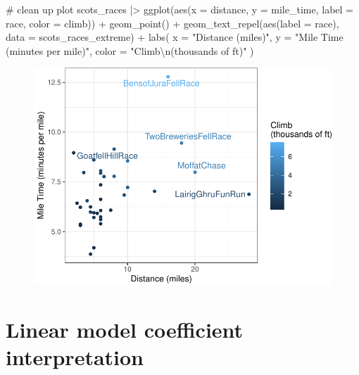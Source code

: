\documentclass[
  11pt,
  letterpaper,
  oneside]{book}
\newenvironment{Shaded}{\begin{snugshade}}{\end{snugshade}}
\newcommand{\AttributeTok}[1]{\textcolor[rgb]{0.40,0.45,0.13}{#1}}
\newcommand{\CommentTok}[1]{\textcolor[rgb]{0.37,0.37,0.37}{#1}}
\newcommand{\FunctionTok}[1]{\textcolor[rgb]{0.28,0.35,0.67}{#1}}
\newcommand{\NormalTok}[1]{\textcolor[rgb]{0.00,0.23,0.31}{#1}}
\newcommand{\SpecialCharTok}[1]{\textcolor[rgb]{0.37,0.37,0.37}{#1}}
\newcommand{\StringTok}[1]{\textcolor[rgb]{0.13,0.47,0.30}{#1}}
\theoremstyle{plain}
\theoremstyle{plain}
\theoremstyle{definition}
\theoremstyle{definition}
\theoremstyle{plain}
\theoremstyle{remark}
\begin{document}
\begin{Shaded}
\begin{Highlighting}[]
\CommentTok{\# clean up plot}
\NormalTok{scots\_races }\SpecialCharTok{|\textgreater{}}
  \FunctionTok{ggplot}\NormalTok{(}\FunctionTok{aes}\NormalTok{(}\AttributeTok{x =}\NormalTok{ distance, }\AttributeTok{y =}\NormalTok{ mile\_time, }\AttributeTok{label =}\NormalTok{ race, }\AttributeTok{color =}\NormalTok{ climb)) }\SpecialCharTok{+}
  \FunctionTok{geom\_point}\NormalTok{() }\SpecialCharTok{+}
  \FunctionTok{geom\_text\_repel}\NormalTok{(}\FunctionTok{aes}\NormalTok{(}\AttributeTok{label =}\NormalTok{ race), }\AttributeTok{data =}\NormalTok{ scots\_races\_extreme) }\SpecialCharTok{+}
  \FunctionTok{labs}\NormalTok{(}
    \AttributeTok{x =} \StringTok{"Distance (miles)"}\NormalTok{,}
    \AttributeTok{y =} \StringTok{"Mile Time (minutes per mile)"}\NormalTok{,}
    \AttributeTok{color =} \StringTok{"Climb}\SpecialCharTok{\textbackslash{}n}\StringTok{(thousands of ft)"}
\NormalTok{  )}
\end{Highlighting}
\end{Shaded}

\begin{figure}[H]

{\centering \includegraphics{r-demo-part-1_files/figure-pdf/unnamed-chunk-8-1.pdf}

}

\end{figure}

\hypertarget{linear-model-coefficient-interpretation}{%
\section{Linear model coefficient
interpretation}\label{linear-model-coefficient-interpretation}}
\end{document}
